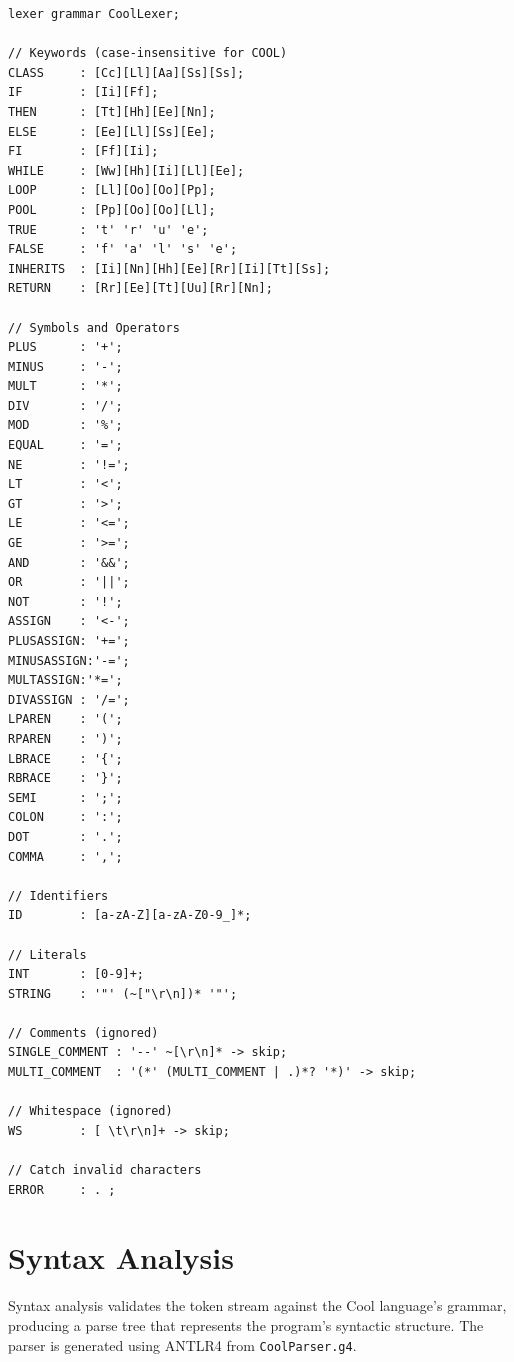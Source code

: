 \documentclass[12pt]{article}
\begin{document}
\begin{lstlisting}[language=ANTLR,caption={Excerpt from Coolexer.g4}]
lexer grammar CoolLexer;

// Keywords (case-insensitive for COOL)
CLASS     : [Cc][Ll][Aa][Ss][Ss];
IF        : [Ii][Ff];
THEN      : [Tt][Hh][Ee][Nn];
ELSE      : [Ee][Ll][Ss][Ee];
FI        : [Ff][Ii];
WHILE     : [Ww][Hh][Ii][Ll][Ee];
LOOP      : [Ll][Oo][Oo][Pp];
POOL      : [Pp][Oo][Oo][Ll];
TRUE      : 't' 'r' 'u' 'e';
FALSE     : 'f' 'a' 'l' 's' 'e';
INHERITS  : [Ii][Nn][Hh][Ee][Rr][Ii][Tt][Ss];
RETURN    : [Rr][Ee][Tt][Uu][Rr][Nn];

// Symbols and Operators
PLUS      : '+';
MINUS     : '-';
MULT      : '*';
DIV       : '/';
MOD       : '%';
EQUAL     : '=';
NE        : '!=';
LT        : '<';
GT        : '>';
LE        : '<=';
GE        : '>=';
AND       : '&&';
OR        : '||';
NOT       : '!';
ASSIGN    : '<-';
PLUSASSIGN: '+=';
MINUSASSIGN:'-=';
MULTASSIGN:'*=';
DIVASSIGN : '/=';
LPAREN    : '(';
RPAREN    : ')';
LBRACE    : '{';
RBRACE    : '}';
SEMI      : ';';
COLON     : ':';
DOT       : '.';
COMMA     : ',';

// Identifiers
ID        : [a-zA-Z][a-zA-Z0-9_]*;

// Literals
INT       : [0-9]+;
STRING    : '"' (~["\r\n])* '"';

// Comments (ignored)
SINGLE_COMMENT : '--' ~[\r\n]* -> skip;
MULTI_COMMENT  : '(*' (MULTI_COMMENT | .)*? '*)' -> skip;

// Whitespace (ignored)
WS        : [ \t\r\n]+ -> skip;

// Catch invalid characters
ERROR     : . ;
\end{lstlisting}

\section{Syntax Analysis}
Syntax analysis validates the token stream against the Cool language’s grammar, producing a parse tree that represents the program’s syntactic structure. The parser is generated using ANTLR4 from \texttt{CoolParser.g4}.
\end{document}

